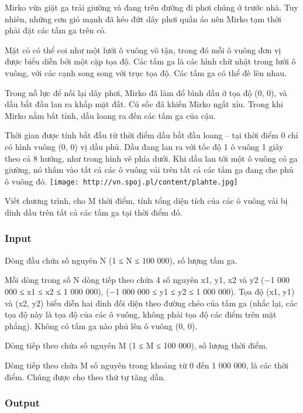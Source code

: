 



   Mirko vừa giặt ga trải giường và đang trên đường đi phơi chúng ở trước nhà. Tuy nhiên, những cơn gió mạnh đã kéo đứt dây phơi quần áo nên Mirko tạm thời phải đặt các tấm ga trên cỏ.  

   Mặt cỏ có thể coi như một lưới ô vuông vô tận, trong đó mỗi ô vuông đơn vị được biểu diễn bởi một cặp tọa độ. Các tấm ga là các hình chữ nhật trong lưới ô vuông, với các cạnh song song với trục tọa độ. Các tấm ga có thể đè lên nhau.  

   Trong nỗ lực để nối lại dây phơi, Mirko đã làm đổ bình dầu ở tọa độ (0, 0), và dầu bắt đầu lan ra khắp mặt đất. Cú sốc đã khiến Mirko ngất xỉu. Trong khi Mirko nằm bất tỉnh, dầu loang ra đến các tấm ga của cậu.  

   Thời gian được tính bắt đầu từ thời điểm dầu bắt đầu loang – tại thời điểm 0 chỉ có hình vuông (0, 0) vị dầu phủ. Dầu đang lan ra với tốc độ 1 ô vuông 1 giây theo cả 8 hướng, như trong hình vẽ phía dưới. Khi dầu lan tới một ô vuông có ga giường, nó thấm vào tất cả các ô vuông vải trên tất cả các tấm ga đang che phủ ô vuông đó.  
\texttt{[image: http://vn.spoj.pl/content/plahte.jpg]}

   Viết chương trình, cho M thời điểm, tính tổng diện tích của các ô vuông vải bị dính dầu trên tất cả các tấm ga tại thời điểm đó.  

\subsubsection{   Input  }

   Dòng đầu chứa số nguyên N (1 ≤ N ≤ 100 000), số lượng tấm ga.  

   Mỗi dòng trong số N dòng tiếp theo chứa 4 số nguyên x1, y1, x2 và y2 (−1 000 000 ≤ x1 ≤ x2 ≤ 1 000 000), (−1 000 000 ≤ y1 ≤ y2 ≤ 1 000 000). Tọa độ (x1, y1) và (x2, y2) biểu diễn hai đỉnh đối diện theo đường chéo của tấm ga (nhắc lại, các tọa độ này là tọa độ của các ô vuông, không phải tọa độ các điểm trên mặt phẳng). Không có tấm ga nào phủ lên ô vuông (0, 0).  

   Dòng tiếp theo chứa số nguyên M (1 ≤ M ≤ 100 000), số lượng thời điểm.  

   Dòng tiếp theo chứa M số nguyên trong khoảng từ 0 đến 1 000 000, là các thời điểm. Chúng được cho theo thứ tự tăng dần.  

\subsubsection{   Output  }

